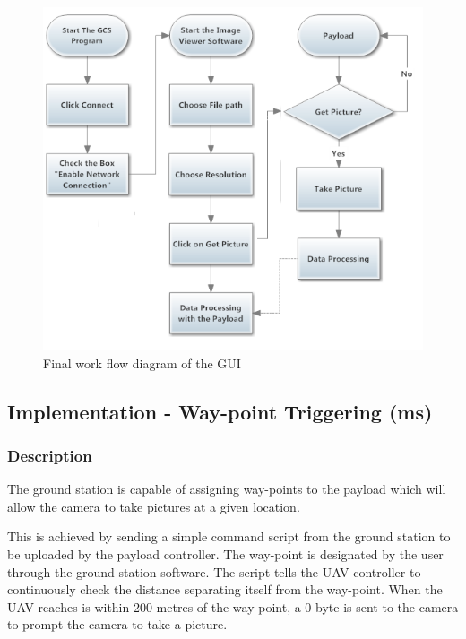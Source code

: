 \begin{figure}[H]
\begin{center}
\includegraphics[scale=1]{figures/finalWorkFlow.png} 
\end{center}
\caption{Final work flow diagram of the GUI\label{GUI_finalWorkFlow}}
\end{figure}

\subsection{Implementation - Way-point Triggering (ms)}
\label{sec:waypoint_triggering}

\subsubsection{Description}

The ground station is capable of assigning way-points to
the payload which will allow the camera to take pictures 
at a given location.

This is achieved by sending a simple command script from
the ground station to be uploaded by the payload 
controller. The way-point is designated by the user
through the ground station software. The script 
tells the UAV controller to continuously check the
distance separating itself from the way-point.
When the UAV reaches is within 200 metres of the
way-point, a 0 byte is sent to the camera to prompt
the camera to take a picture.


